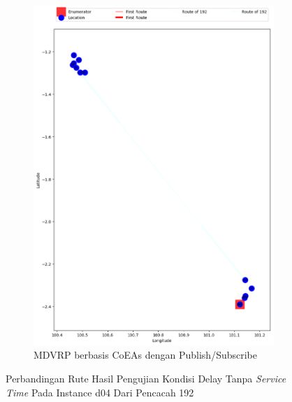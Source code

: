 \begin{figure}[H]\ContinuedFloat
	\centering
	\begin{subfigure}[t]{\textwidth}
		\centering
		\includegraphics[width=\textwidth]{Resources/Images/delayed_5/real_m15_n100_delayed_5_192_pubsub_coes}
		\caption{MDVRP berbasis CoEAs dengan Publish/Subscribe}
		\label{fig:real_m15_n100_delayed_5_192_pubsub_coes}
	\end{subfigure}
	\caption{Perbandingan Rute Hasil Pengujian Kondisi Delay Tanpa \textit{Service Time} Pada Instance d04 Dari Pencacah 192}
	\label{fig:real_m15_n100_delayed_5_192_contd}
\end{figure}



